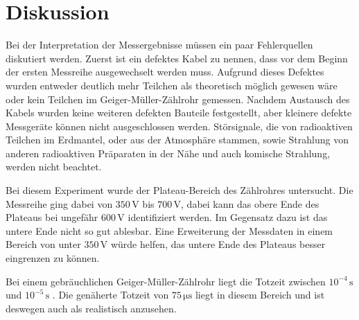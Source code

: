 \section{Diskussion}
\label{sec:Diskussion}

Bei der Interpretation der Messergebnisse müssen ein paar Fehlerquellen diskutiert werden.
Zuerst ist ein defektes Kabel zu nennen, dass vor dem Beginn der ersten Messreihe ausgewechselt werden muss. Aufgrund dieses Defektes wurden entweder deutlich mehr Teilchen als theoretisch möglich gewesen wäre oder kein Teilchen im Geiger-Müller-Zählrohr gemessen.
Nachdem Austausch des Kabels wurden keine weiteren defekten Bauteile festgestellt, aber kleinere defekte Messgeräte können nicht ausgeschlossen werden.
Störsignale, die von radioaktiven Teilchen im Erdmantel, oder aus der Atmosphäre stammen, sowie Strahlung von anderen radioaktiven Präparaten in der Nähe und auch komische Strahlung, werden nicht beachtet.

Bei diesem Experiment wurde der Plateau-Bereich des Zählrohres untersucht. Die Messreihe ging dabei von $350 \,\unit{\volt}$ bis $700 \,\unit{\volt}$, dabei kann das obere Ende des Plateaus bei ungefähr $600 \, \unit{\volt}$ identifiziert werden.
Im Gegensatz dazu ist das untere Ende nicht so gut ablesbar. Eine Erweiterung der Messdaten in einem Bereich von unter $350 \, \unit{\volt}$ würde helfen, das untere Ende des Plateaus besser eingrenzen zu können.

Bei einem gebräuchlichen Geiger-Müller-Zählrohr liegt die Totzeit zwischen $10^{-4} \, \unit{\second}$ und $10^{-5} \, \unit{\second}$ \cite{ap01}. Die genäherte Totzeit von $ 75 \,\unit{\micro\second}$ liegt in diesem Bereich und ist deswegen auch als realistisch anzusehen.